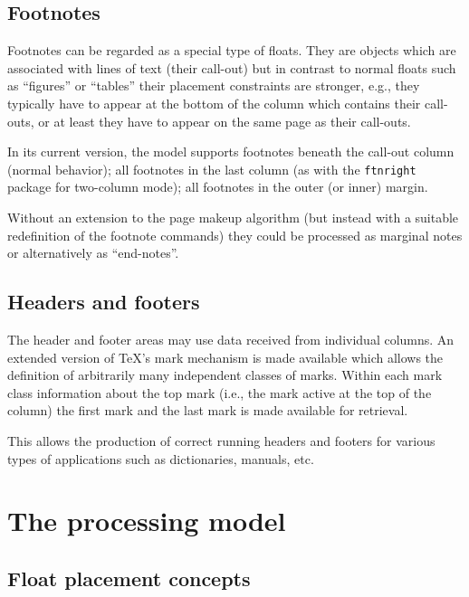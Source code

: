 \documentclass[twocolumn]{article}
\begin{document}
\subsection{Footnotes}\label{footnotes}


Footnotes can be regarded as a special type of floats. They are objects
which are associated with lines of text (their call-out) but in
contrast to normal floats such as ``figures'' or ``tables'' their placement
constraints are stronger, e.g., they typically have to appear at the
bottom of the column which contains their call-outs, or at least they
have to appear on the same page as their call-outs.

In its current version, the model supports footnotes beneath the
call-out column (normal behavior); all footnotes in the last column
(as with the \texttt{ftnright} package for two-column mode); all
footnotes in the outer (or inner) margin. 

Without an extension to the page makeup algorithm (but instead with a
suitable redefinition of the footnote commands) they could be processed
as marginal notes or alternatively as ``end-notes''.


\subsection{Headers and footers}

The header and footer areas may use data received from individual
columns. An extended version of \TeX's mark mechanism is made
available which allows the definition of arbitrarily many independent
classes of marks. Within each mark class information about the top
mark (i.e., the mark active at the top of the column) the first mark
and the last mark is made available for retrieval.

This allows the production of correct running headers and footers for
various types of applications such as dictionaries, manuals, etc.



\section{The processing model}

\subsection{Float placement concepts}\label{sec:float-place}
\end{document}
